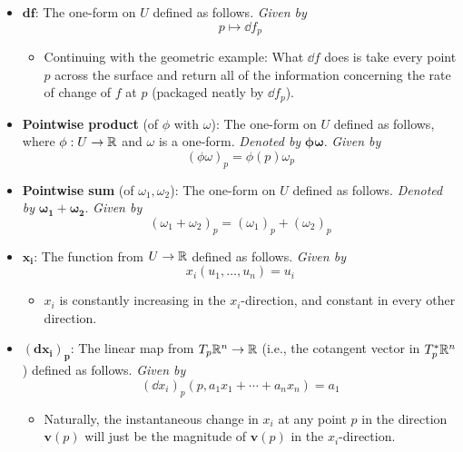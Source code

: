 \documentclass[../notes.tex]{subfiles}
\begin{document}
\begin{itemize}
\begin{itemize}
    \end{itemize}
    \item $\bm{\mathbf{d}f}$: The one-form on $U$ defined as follows. \emph{Given by}
    \begin{equation*}
        p \mapsto \dd f_p
    \end{equation*}
    \begin{itemize}
        \item Continuing with the geometric example: What $\dd f$ does is take every point $p$ across the surface and return all of the information concerning the rate of change of $f$ at $p$ (packaged neatly by $\dd f_p$).
    \end{itemize}
    \item \textbf{Pointwise product} (of $\phi$ with $\omega$): The one-form on $U$ defined as follows, where $\phi:U\to\mathbb{R}$ and $\omega$ is a one-form. \emph{Denoted by} $\bm{\phi\omega}$. \emph{Given by}
    \begin{equation*}
        (\phi\omega)_p = \phi(p)\omega_p
    \end{equation*}
    \item \textbf{Pointwise sum} (of $\omega_1,\omega_2$): The one-form on $U$ defined as follows. \emph{Denoted by} $\bm{\omega_1+\omega_2}$. \emph{Given by}
    \begin{equation*}
        (\omega_1+\omega_2)_p = (\omega_1)_p+(\omega_2)_p
    \end{equation*}
    \item $\bm{x_i}$: The function from $U\to\mathbb{R}$ defined as follows. \emph{Given by}
    \begin{equation*}
        x_i(u_1,\dots,u_n) = u_i
    \end{equation*}
    \begin{itemize}
        \item $x_i$ is constantly increasing in the $x_i$-direction, and constant in every other direction.
    \end{itemize}
    \item $\bm{(\mathbf{d}x_i)_p}$: The linear map from $T_p\mathbb{R}^n\to\mathbb{R}$ (i.e., the cotangent vector in $T_p^*\mathbb{R}^n$) defined as follows. \emph{Given by}
    \begin{equation*}
        (\dd x_i)_p(p,a_1x_1+\cdots+a_nx_n) = a_1
    \end{equation*}
    \begin{itemize}
        \item Naturally, the instantaneous change in $x_i$ at any point $p$ in the direction $\bm{v}(p)$ will just be the magnitude of $\bm{v}(p)$ in the $x_i$-direction.

\end{itemize}
\end{itemize}
\end{document}
